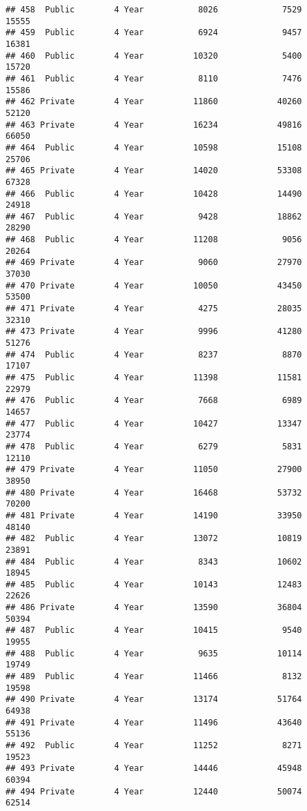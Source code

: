 \documentclass[
]{article}
\begin{document}
\begin{verbatim}
## 458  Public        4 Year           8026             7529          15555
## 459  Public        4 Year           6924             9457          16381
## 460  Public        4 Year          10320             5400          15720
## 461  Public        4 Year           8110             7476          15586
## 462 Private        4 Year          11860            40260          52120
## 463 Private        4 Year          16234            49816          66050
## 464  Public        4 Year          10598            15108          25706
## 465 Private        4 Year          14020            53308          67328
## 466  Public        4 Year          10428            14490          24918
## 467  Public        4 Year           9428            18862          28290
## 468  Public        4 Year          11208             9056          20264
## 469 Private        4 Year           9060            27970          37030
## 470 Private        4 Year          10050            43450          53500
## 471 Private        4 Year           4275            28035          32310
## 473 Private        4 Year           9996            41280          51276
## 474  Public        4 Year           8237             8870          17107
## 475  Public        4 Year          11398            11581          22979
## 476  Public        4 Year           7668             6989          14657
## 477  Public        4 Year          10427            13347          23774
## 478  Public        4 Year           6279             5831          12110
## 479 Private        4 Year          11050            27900          38950
## 480 Private        4 Year          16468            53732          70200
## 481 Private        4 Year          14190            33950          48140
## 482  Public        4 Year          13072            10819          23891
## 484  Public        4 Year           8343            10602          18945
## 485  Public        4 Year          10143            12483          22626
## 486 Private        4 Year          13590            36804          50394
## 487  Public        4 Year          10415             9540          19955
## 488  Public        4 Year           9635            10114          19749
## 489  Public        4 Year          11466             8132          19598
## 490 Private        4 Year          13174            51764          64938
## 491 Private        4 Year          11496            43640          55136
## 492  Public        4 Year          11252             8271          19523
## 493 Private        4 Year          14446            45948          60394
## 494 Private        4 Year          12440            50074          62514

\end{verbatim}
\end{document}
